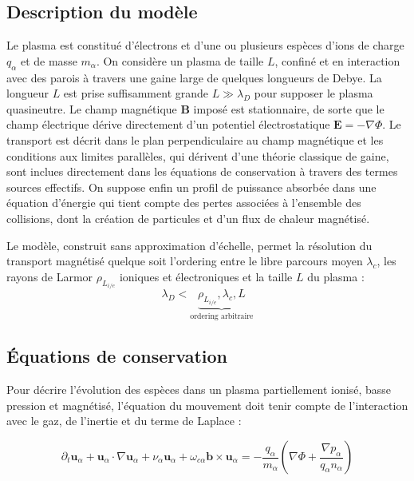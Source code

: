 \begin{refsection}
\section{Description du modèle}
Le plasma est constitué d'électrons et d'une ou plusieurs espèces d'ions de
charge $q_\alpha$ et de masse $m_\alpha$. On considère un plasma de taille $L$,
confiné et en interaction avec des parois à travers une gaine large de quelques longueurs
de Debye. La longueur $L$ est prise suffisamment grande $L\gg\lambda_D$ pour
supposer le plasma quasineutre. Le champ magnétique $\mathbf{B}$ imposé est 
stationnaire, de sorte que le champ électrique dérive directement d'un 
potentiel électrostatique $\mathbf{E}=-\nabla \Phi$. Le transport est décrit
dans le plan perpendiculaire au champ magnétique et les conditions aux limites
parallèles, qui dérivent d'une théorie classique de gaine, sont
inclues directement dans les équations de conservation à travers des termes
sources effectifs. On suppose enfin un profil de puissance absorbée dans une
équation d'énergie qui tient compte des pertes associées à l'ensemble des
collisions, dont la création de particules et d'un flux de chaleur magnétisé.

Le modèle, construit sans approximation d'échelle, permet la résolution du
transport magnétisé quelque soit l'ordering entre le libre parcours moyen
$\lambda_c$, les rayons de Larmor $\rho_{L_{i/e}}$ ioniques et électroniques et
la taille $L$ du plasma :
\begin{equation*}
\lambda_D<\underbrace{\rho_{L_{i/e}},\lambda_c,L}_\text{ordering arbitraire}
\end{equation*}

\subsection{Équations de conservation}
Pour décrire l'évolution des espèces dans un plasma partiellement ionisé, basse
pression et magnétisé, l'équation du mouvement doit tenir compte de
l'interaction avec le gaz, de l'inertie et du terme de Laplace :

\begin{equation}
\label{3-eqMouvement}
\partial_t \mathbf{u}_\alpha + \mathbf{u}_\alpha\cdot\nabla\mathbf{u}_\alpha+
\nu_\alpha\mathbf{u}_\alpha+\omega_{c\alpha}\mathbf{b}\times\mathbf{u}_\alpha=
-\frac{q_\alpha}{m_\alpha}\left(\nabla \Phi+\frac{\nabla
p_\alpha}{q_\alpha n_\alpha}\right)
\end{equation}


\end{refsection}
